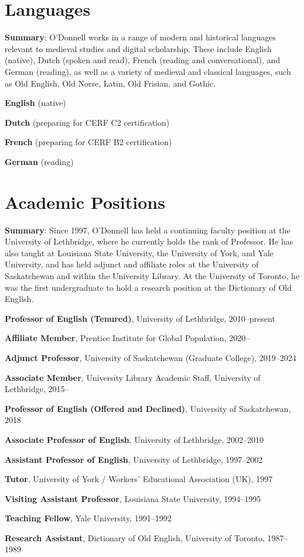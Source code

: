 \documentclass[12pt]{article}
\begin{document}
\section*{Languages}

\textbf{Summary}: O'Donnell works in a range of modern and historical languages relevant to medieval studies and digital scholarship. These include English (native), Dutch (spoken and read), French (reading and conversational), and German (reading), as well as a variety of medieval and classical languages, such as Old English, Old Norse, Latin, Old Frisian, and Gothic.

\begin{hangparas}{1.5em}{1}
\textbf{English} (native)

\textbf{Dutch} (preparing for CERF C2 certification)

\textbf{French} (preparing for CERF B2 certification)

\textbf{German} (reading)
\end{hangparas}

\section*{Academic Positions}

\textbf{Summary}: Since 1997, O'Donnell has held a continuing faculty position at the University of Lethbridge, where he currently holds the rank of Professor. He has also taught at Louisiana State University, the University of York, and Yale University, and has held adjunct and affiliate roles at the University of Saskatchewan and within the University Library. At the University of Toronto, he was the first undergraduate to hold a research position at the Dictionary of Old English.

\begin{hangparas}{1.5em}{1}
\textbf{Professor of English (Tenured)}, University of Lethbridge, 2010–present

\textbf{Affiliate Member}, Prentice Institute for Global Population, 2020–

\textbf{Adjunct Professor}, University of Saskatchewan (Graduate College), 2019–2024

\textbf{Associate Member}, University Library Academic Staff, University of Lethbridge, 2015–

\textbf{Professor of English (Offered and Declined)}, University of Saskatchewan, 2018

\textbf{Associate Professor of English}, University of Lethbridge, 2002–2010

\textbf{Assistant Professor of English}, University of Lethbridge, 1997–2002

\textbf{Tutor}, University of York / Workers’ Educational Association (UK), 1997

\textbf{Visiting Assistant Professor}, Louisiana State University, 1994–1995

\textbf{Teaching Fellow}, Yale University, 1991–1992

\textbf{Research Assistant}, Dictionary of Old English, University of Toronto, 1987–1989
\end{hangparas}
\end{document}
